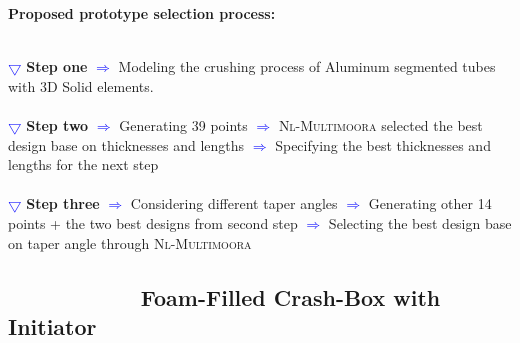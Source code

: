 \documentclass{beamer}
\newcommand*\circled[1]{\tikz[baseline=(char.base)]{
		\node[shape=circle,draw,inner sep=2pt] (char) {#1};}}
\begin{document}
		\begin{frame}%
\textbf{		Proposed prototype selection process:}\\ 				\pause
		~
		{\footnotesize
			
			\textcolor{blue}{$ \bigtriangledown $} \textbf{Step one}
			\textcolor{blue}{$ \Longrightarrow $} Modeling the crushing process of Aluminum segmented tubes with 3D Solid elements. \\
						\pause
			~
			\\
			\textcolor{blue}{	$ \bigtriangledown $} \textbf{Step two}
			\textcolor{blue}{$ \Longrightarrow $}  Generating 39 points \textcolor{blue}{$ \Longrightarrow $} 	\textsc{Nl-Multimoora} selected the best design base on thicknesses and lengths  
		 \textcolor{blue}{$ \Longrightarrow $} Specifying the best thicknesses and lengths for the next step \\
		 				\pause
			~
			\\
			\textcolor{blue}	{	$ \bigtriangledown $} \textbf{Step three}
			\textcolor{blue}{$ \Longrightarrow $} Considering different taper angles 
			 \textcolor{blue}{$ \Longrightarrow $}  Generating other 14 points + the two best designs from second step
			\textcolor{blue}{$ \Longrightarrow $} Selecting the best design base on taper angle through 
			\textsc{Nl-Multimoora} 
		}
		
	\end{frame}
	
	
	
	\subsection{	  ~~~~ ~~~~ ~ {Foam-Filled Crash-Box with Initiator} }
	
\end{document}
